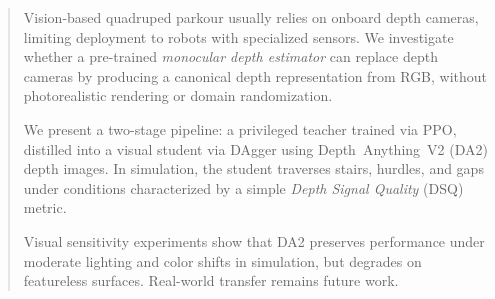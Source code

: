 \begin{abstract}
	Vision-based quadruped parkour usually relies on onboard depth cameras, limiting deployment to robots with specialized sensors. We investigate whether a pre-trained \emph{monocular depth estimator} can replace depth cameras by producing a canonical depth representation from RGB, without photorealistic rendering or domain randomization.

	We present a two-stage pipeline: a privileged teacher trained via PPO, distilled into a visual student via DAgger using Depth~Anything~V2 (DA2) depth images. In simulation, the student traverses stairs, hurdles, and gaps under conditions characterized by a simple \emph{Depth Signal Quality} (DSQ) metric.

	Visual sensitivity experiments show that DA2 preserves performance under moderate lighting and color shifts in simulation, but degrades on featureless surfaces. Real-world transfer remains future work.
\end{abstract}
